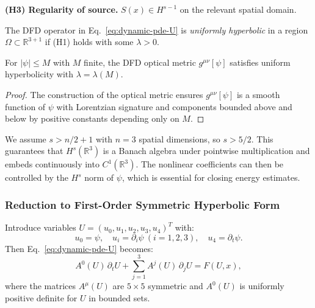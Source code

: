\medskip
\noindent\textbf{(H3) Regularity of source.}
$S(x) \in H^{s-1}$ on the relevant spatial domain.

\begin{definition}\label{def:hyperbolic-U}
The DFD operator in Eq.~\eqref{eq:dynamic-pde-U} is \emph{uniformly hyperbolic} 
in a region $\Omega \subset \mathbb{R}^{3+1}$ if (H1) holds with some $\lambda > 0$.
\end{definition}

\begin{proposition}\label{prop:dfd-hyperbolic-U}
For $|\psi| \leq M$ with $M$ finite, the DFD optical metric $g^{\mu\nu}[\psi]$ 
satisfies uniform hyperbolicity with $\lambda = \lambda(M)$.
\end{proposition}

\begin{proof}
The construction of the optical metric ensures $g^{\mu\nu}[\psi]$ is a smooth 
function of $\psi$ with Lorentzian signature and components bounded above and 
below by positive constants depending only on $M$.
\end{proof}

\begin{remark}
We assume $s > n/2 + 1$ with $n = 3$ spatial dimensions, so $s > 5/2$. This 
guarantees that $H^s(\mathbb{R}^3)$ is a Banach algebra under pointwise 
multiplication and embeds continuously into $C^1(\mathbb{R}^3)$. The nonlinear 
coefficients can then be controlled by the $H^s$ norm of $\psi$, which is 
essential for closing energy estimates.
\end{remark}

\subsubsection{Reduction to First-Order Symmetric Hyperbolic Form}

Introduce variables $U = (u_0, u_1, u_2, u_3, u_4)^T$ with:
\begin{equation}
u_0 = \psi, \quad u_i = \partial_i\psi~(i=1,2,3), \quad u_4 = \partial_t\psi.
\end{equation}
Then Eq.~\eqref{eq:dynamic-pde-U} becomes:
\begin{equation}\label{eq:first-order-U}
A^0(U)\,\partial_t U + \sum_{j=1}^3 A^j(U)\,\partial_j U = F(U, x),
\end{equation}
where the matrices $A^\mu(U)$ are $5 \times 5$ symmetric and $A^0(U)$ is 
uniformly positive definite for $U$ in bounded sets.

